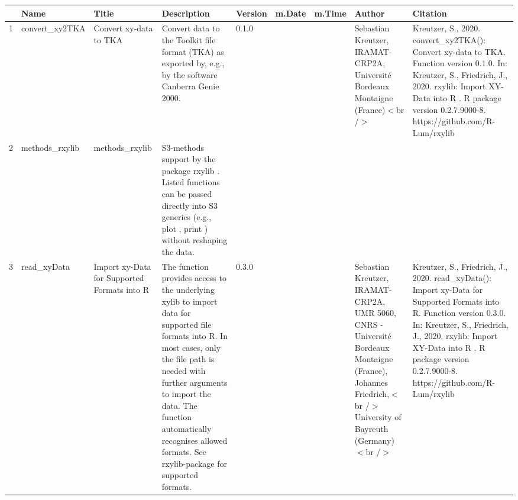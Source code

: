 \begin{table}[ht]
\centering
\begin{tabular}{rllllllll}
  \hline
 & Name & Title & Description & Version & m.Date & m.Time & Author & Citation \\ 
  \hline
1 & convert\_xy2TKA & Convert xy-data to TKA & Convert data to the Toolkit file format (TKA) as exported by, e.g., by the software Canberra Genie 2000. & 0.1.0
 &  &  & Sebastian Kreutzer, IRAMAT-CRP2A, Université Bordeaux Montaigne (France)$<$br /$>$ & Kreutzer, S., 2020. convert\_xy2TKA(): Convert xy-data to TKA. Function version 0.1.0. In: Kreutzer, S., Friedrich, J., 2020. rxylib: Import XY-Data into R . R package version 0.2.7.9000-8. https://github.com/R-Lum/rxylib
 \\ 
  2 & methods\_rxylib & methods\_rxylib & S3-methods support by the package  rxylib . Listed functions can be passed directly into S3 generics (e.g.,  plot ,  print ) without reshaping the data. &  &  &  &  &  \\ 
  3 & read\_xyData & Import xy-Data for Supported Formats into R & The function provides access to the underlying  xylib  to import data for supported file formats into R. In most cases, only the file path is needed with further arguments to import the data. The function automatically recognises allowed formats. See  rxylib-package  for supported formats. & 0.3.0
 &  &  & Sebastian Kreutzer, IRAMAT-CRP2A, UMR 5060, CNRS - Université Bordeaux Montaigne (France), Johannes Friedrich,$<$br /$>$ University of Bayreuth (Germany)$<$br /$>$ & Kreutzer, S., Friedrich, J., 2020. read\_xyData(): Import xy-Data for Supported Formats into R. Function version 0.3.0. In: Kreutzer, S., Friedrich, J., 2020. rxylib: Import XY-Data into R . R package version 0.2.7.9000-8. https://github.com/R-Lum/rxylib
 \\ 
   \hline
\end{tabular}
\end{table}

